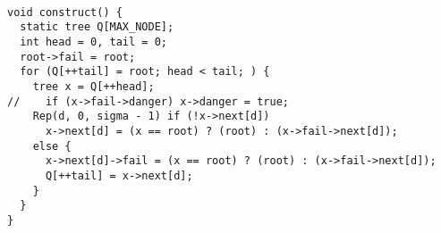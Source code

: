 \begin{lstlisting}

void construct() {
  static tree Q[MAX_NODE];
  int head = 0, tail = 0;
  root->fail = root;
  for (Q[++tail] = root; head < tail; ) {
    tree x = Q[++head];
//    if (x->fail->danger) x->danger = true;
    Rep(d, 0, sigma - 1) if (!x->next[d])
      x->next[d] = (x == root) ? (root) : (x->fail->next[d]);
    else {
      x->next[d]->fail = (x == root) ? (root) : (x->fail->next[d]);
      Q[++tail] = x->next[d];
    }
  }
}
\end{lstlisting}